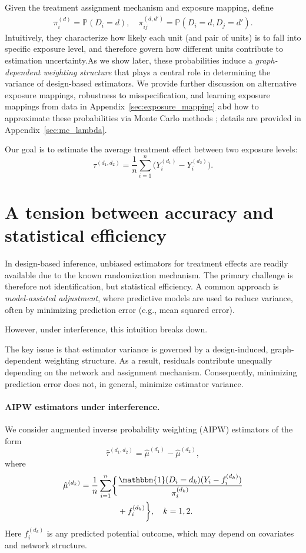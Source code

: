 \documentclass[twoside]{article}
\theoremstyle{plain}
\theoremstyle{definition}
\theoremstyle{remark}
\newcommand{\indicator}{\mathbbm{1}}
\begin{document}
Given the treatment assignment mechanism and exposure mapping, define
\begin{align}\label{eq::prob}
\pi_i^{(d)} = \mathbb{P}(D_i = d), \quad
\pi_{ij}^{(d,d')} = \mathbb{P}(D_i = d, D_j = d').
\end{align}
 Intuitively, they characterize how likely each unit (and pair of units) is to fall into specific exposure level, and therefore govern how different units contribute to estimation uncertainty.As we show later, these probabilities induce a \emph{graph-dependent weighting structure} that plays a central role in determining the variance of design-based estimators. We provide further discussion on alternative exposure mappings, robustness to misspecification, and learning exposure mappings from data in Appendix~\ref{sec:exposure_mapping} abd
how to approximate these probabilities via Monte Carlo methods \citep{aronow2017estimating}; details are provided in Appendix~\ref{sec:mc_lambda}.

Our goal is to estimate the average treatment effect between two exposure levels:
\[
\tau^{(d_1,d_2)} = \frac{1}{n} \sum_{i=1}^n \bigl( Y_i^{(d_1)} - Y_i^{(d_2)} \bigr).
\]

\section{A tension between accuracy and statistical efficiency}
\label{sec::model_assisted_adjustment}

In design-based inference, unbiased estimators for treatment effects are readily available due to the known randomization mechanism. The primary challenge is therefore not identification, but statistical efficiency. A common approach is \emph{model-assisted adjustment}, where predictive models are used to reduce variance, often by minimizing prediction error (e.g., mean squared error).

However, under interference, this intuition breaks down.

The key issue is that estimator variance is governed by a design-induced, graph-dependent weighting structure. As a result, residuals contribute unequally depending on the network and assignment mechanism. Consequently, minimizing prediction error does not, in general, minimize estimator variance.

\paragraph{AIPW estimators under interference.}
We consider augmented inverse probability weighting (AIPW) estimators of the form
\begin{equation}\label{eq::aipw_def}
\hat\tau^{(d_1,d_2)} = \hat{\mu}^{(d_1)} - \hat{\mu}^{(d_2)},
\end{equation}
where
\begin{align*}
    \hat{\mu}^{(d_k)} = \frac{1}{n}\sum_{i=1}^n \biggl\{& \frac{\indicator(D_i=d_k)(Y_i-f_i^{(d_k)})}{\pi_i^{(d_k)}} \\
    &+ f_i^{(d_k)} \biggr\}, \quad k=1,2.
\end{align*}
Here $f_i^{(d_k)}$ is any predicted potential outcome, which may depend on covariates and network structure.
\end{document}
